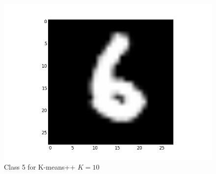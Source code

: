 \documentclass[submit]{harvardml}
\begin{document}
\begin{figure}[ht]
    \includegraphics[scale=0.20]{K10-representative-4-2}
    \caption{Class 5 for K-means++ $K=10$}
\end{figure}
\end{document}
